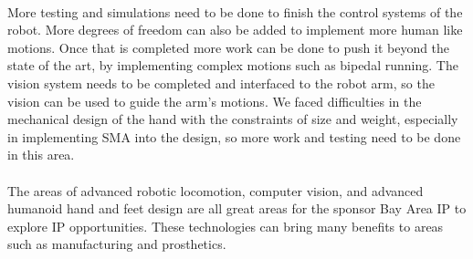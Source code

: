 \documentclass[titlepage,letterpaper,12pt]{article}
\begin{document}
\paragraph{}More testing and simulations need to be done to finish the control
systems of the robot. More degrees of freedom can also be added to implement
more human like motions. Once that is completed more work can be done to push it
beyond the state of the art, by implementing complex motions such as bipedal
running. The vision system needs to be completed and interfaced to the robot
arm, so the vision can be used to guide the arm's motions. We faced difficulties
in the mechanical design of the hand with the constraints of size and weight,
especially in implementing SMA into the design, so more work and testing need to
be done in this area.

\paragraph{}The areas of advanced robotic locomotion, computer vision, and
advanced humanoid hand and feet design are all great areas for the sponsor Bay
Area IP to explore IP opportunities. These technologies can bring many benefits
to areas such as manufacturing and prosthetics.

\clearpage
\printbibliography
\end{document}
